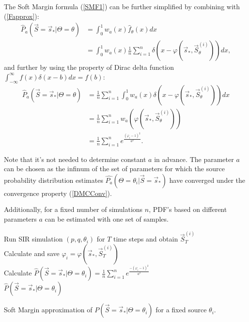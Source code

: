 \documentclass[times, utf8, diplomski]{fer}
\begin{document}
The Soft Margin formula (\ref{SMF1}) can be further simplified by combining with (\ref{Fapprox}):
\begin{equation}
\begin{aligned}
\hat{P}_a(\vec S = \vec s_* | \Theta = \theta) &= \int_0^1 w_a(x)\hat{f}_\theta(x)dx \\ &=
\int_0^1 w_a(x) \frac{1}{n} \sum_{i = 1}^{n}\delta(x - \varphi(\vec s_*, \vec S_{\theta}^{(i)})) dx,
\end{aligned}
\end{equation}
and further by using the property of Dirac delta function $\int_{-\infty}^{\infty} f(x)\delta(x - b)dx = f(b)$:
\begin{equation}
\begin{aligned}
\hat{P}_a(\vec S = \vec s_* | \Theta = \theta) &= \frac{1}{n} \sum_{i = 1}^{n} \int_0^1 w_a(x) \delta(x - \varphi(\vec s_*, \vec S_{\theta}^{(i)})) dx  \\ &= \frac{1}{n} \sum_{i = 1}^{n}  w_a(\varphi(\vec  s_*, \vec S_\theta^{(i)})) \\ &= \frac{1}{n} \sum_{i = 1}^{n} e ^{\frac{(\varphi_i -1)^2}{a ^2}}.
\end{aligned}
\end{equation}

Note that it's not needed to determine constant $a$ in advance. The parameter $a$ can be chosen as the infinum of the set of parameters for which the source probability distribution estimates $\hat{P_a}(\Theta = \theta_i | \vec S = \vec s_*)$ have converged under the convergence property (\ref{DMCConv}). 

Additionally, for a fixed number of simulations $n$, PDF's  based on different parameters $a$ can be estimated with one set of samples. 

\vspace{5mm}
\begin{algorithm}[H]
  {
    Run SIR simulation $(p, q, \theta_i)$ for $T$ time steps and obtain  
    $\vec S_T^{(i)}$\\
    Calculate and save $\varphi_i = \varphi(\vec s_*, \vec S_T^{(i)})$\\
 }
  Calculate $\hat{P}(\vec S = \vec s_* | \Theta = \theta_i) = \frac{1}{n} \sum_{i = 1}^{n} e ^ {\frac{-(\varphi_i -1)^2}{a^2}}$\\
  \Return $\hat{P}(\vec S = \vec s_* | \Theta = \theta_i)$
 \caption{Soft Margin approximation of $P(\vec S = \vec s_* | \Theta = \theta_i)$ for a fixed source $\theta_i$.}
\end{algorithm}
 \AlgoDontDisplayBlockMarkers%
\end{document}
